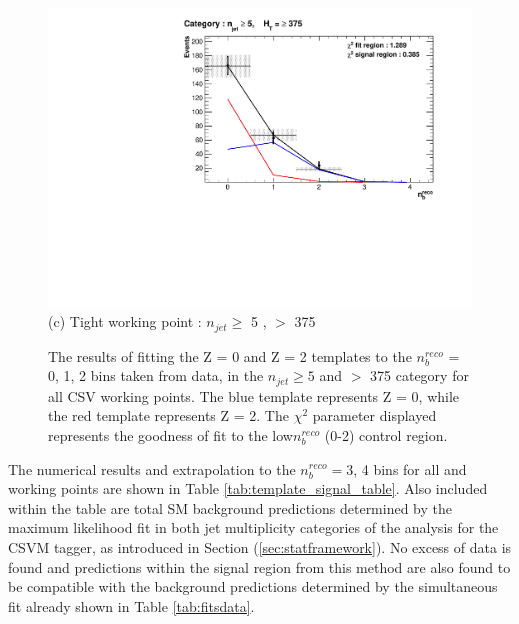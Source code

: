 \begin{figure}[ht]
\begin{minipage}[b]{0.51\linewidth}
\centering
\includegraphics[width = 1.0\linewidth]{plots/TemplatesSignal/Final_Fit_To_Data_Normal_Tight_HTBin_Template_375_jet_mult_5.pdf}
\centering (c) Tight working point :  $n_{jet} \geq$ 5 , \theht $>$ 375 
\end{minipage}
\caption[The results of fitting the Z = 0 and Z = 2 templates to the $n_{b}^{reco}$ = 0, 1, 2 bins taken from data, in the $n_{jet} \geq 5$ and \theht $>$ 375 category for all \ac{CSV} working points.]{The results of fitting the Z = 0 and Z = 2 templates to the $n_{b}^{reco}$ = 0, 1, 2 bins taken from data, in the $n_{jet} \geq 5$ and \theht $>$ 375 category for all \ac{CSV} working points. The blue template represents Z = 0, while the red template represents Z = 2. The $\chi^{2}$ parameter displayed represents the goodness of fit to the low$ n_{b}^{reco}$ (0-2) control region.}
\label{fig:template_data_signal_njet5}
\end{figure}

The numerical results and extrapolation to the $n_{b}^{reco} =$3, 4 bins for all \theht and working points are shown in Table \ref{tab:template_signal_table}. Also included within the table are total \ac{SM} background predictions determined by the maximum likelihood fit in both jet multiplicity categories of the \alphat analysis for the \ac{CSVM} tagger, as introduced in Section (\ref{sec:statframework}). No excess of data is found and predictions within the signal region from this method are also found to be compatible with the background predictions determined by the \alphat simultaneous fit already shown in Table \ref{tab:fitsdata}.

